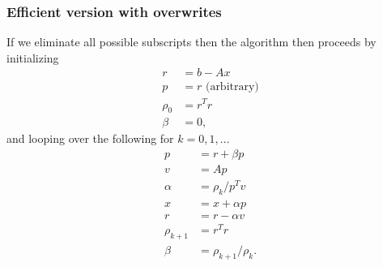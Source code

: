 \documentclass{article}
\begin{document}
\subsubsection{Efficient version with overwrites}
If we eliminate all possible subscripts then 
    the algorithm then proceeds by initializing
    \begin{subequations}\begin{align}
    r &= b - Ax \\
    p &= r \text{ (arbitrary)} \\
    \rho_{0} &= r^T r \\
    \beta &= 0,
    \end{align}\end{subequations}
and looping over the following for $k = 0, 1, \ldots$
    \begin{subequations}\begin{align}
    p &= r + \beta p \\
    v &= A p \\
    \alpha &= \rho_k / p^T v \\
    x &= x + \alpha p \\
    r &= r - \alpha v \\
    \rho_{k+1} &= r^T r \\
    \beta &= \rho_{k+1} / \rho_k.
    \end{align}\end{subequations}
\end{document}

